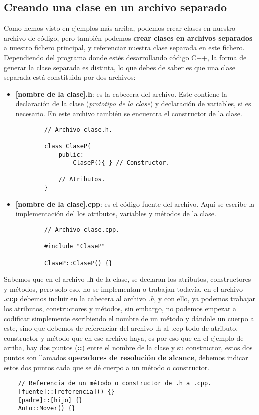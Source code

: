 \subsection{Creando una clase en un archivo separado}

Como hemos visto en ejemplos más arriba, podemos crear clases en nuestro archivo de código, pero también podemos \textbf{crear clases en archivos separados} a nuestro fichero principal, y referenciar nuestra clase separada en este fichero. Dependiendo del programa donde estés desarrollando código C++, la forma de generar la clase separada es distinta, lo que debes de saber es que una clase separada está constituida por dos archivos:
\begin{itemize}
    \item \textbf{[nombre de la clase].h}: es la cabecera del archivo. Este contiene la declaración de la clase (\textit{prototipo de la clase}) y declaración de variables, si es necesario. En este archivo también se encuentra el constructor de la clase.
    \begin{lstlisting}
        // Archivo clase.h.
        
        class ClaseP{
            public:
                ClaseP(){ } // Constructor.
            
            // Atributos.
        }
    \end{lstlisting}
    \item \textbf{[nombre de la clase].cpp}: es el código fuente del archivo. Aquí se escribe la implementación del los atributos, variables y métodos de la clase.
    \begin{lstlisting}
        // Archivo clase.cpp.
        
        #include "ClaseP"
        
        ClaseP::ClaseP() {}
    \end{lstlisting}
\end{itemize}

Sabemos que en el archivo \textbf{.h} de la clase, se declaran los atributos, constructores y métodos, pero solo eso, no se implementan o trabajan todavía, en el archivo \textbf{.ccp} debemos incluir en la cabecera al archivo \textit{.h}, y con ello, ya podemos trabajar los atributos, constructores y métodos, sin embargo, no podemos empezar a codificar simplemente escribiendo el nombre de un método y dándole un cuerpo a este, sino que debemos de referenciar del archivo .h al .ccp todo de atributo, constructor y método que en ese archivo haya, es por eso que en el ejemplo de arriba, hay dos puntos (\textbf{::}) entre el nombre de la clase y su constructor, estos dos puntos son llamados \textbf{operadores de resolución de alcance}, debemos indicar estos dos puntos cada que se dé cuerpo a un método o constructor.
\begin{lstlisting}
    // Referencia de un método o constructor de .h a .cpp.
    [fuente]::[referencia]() {}
    [padre]::[hijo] {}
    Auto::Mover() {}
\end{lstlisting}

